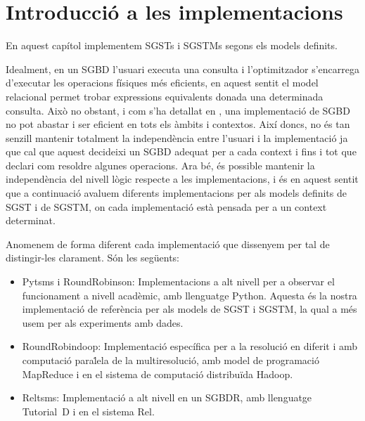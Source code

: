 

\chapter{Introducció a les implementacions}
\label{sec:implementacions}

En aquest capítol implementem \glspl{SGST} i \glspl{SGSTM} segons els
models definits.



Idealment, en un \gls{SGBD} l'usuari executa una consulta i
l'optimitzador s'encarrega d'executar les operacions físiques més
eficients, en aquest sentit el model relacional permet trobar
expressions equivalents donada una determinada consulta. Això no
obstant, i com s'ha detallat en , una
implementació de \gls{SGBD} no pot abastar i ser eficient en tots els
àmbits i contextos. Així doncs, no és tan senzill mantenir totalment
la independència entre l'usuari i la implementació ja que cal que
aquest decideixi un \gls{SGBD} adequat per a cada context i fins i tot
que declari com resoldre algunes operacions.  Ara bé, és possible
mantenir la independència del nivell lògic respecte a les
implementacions, i és en aquest sentit que a continuació avaluem
diferents implementacions per als models definits de \gls{SGST} i de
\gls{SGSTM}, on cada implementació està pensada per a un context
determinat.


Anomenem de forma diferent cada implementació que dissenyem per tal de
distingir-les clarament. Són les següents:

\begin{itemize}
\item Pytsms i RoundRobinson: Implementacions a alt nivell per a
  observar el funcionament a nivell acadèmic, amb llenguatge
  Python. Aquesta és la nostra implementació de referència per als
  models de \gls{SGST} i \gls{SGSTM}, la qual a més usem per als
  experiments amb dades.

\item RoundRobindoop: Implementació específica per a la resolució en
  diferit i amb computació para\.lela de la multiresolució, amb model
  de programació MapReduce i en el sistema de computació distribuïda
  Hadoop.

\item Reltsms: Implementació a alt nivell en un \gls{SGBDR}, amb
  llenguatge Tutorial~D i en el sistema Rel.




\end{itemize}

